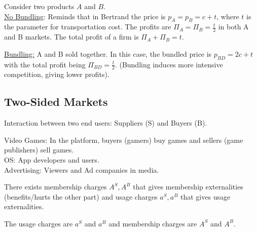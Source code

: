 \documentclass[11pt]{elegantbook}
\begin{document}
Consider two products $A$ and $B$.\\
\underline{No Bundling}: Reminds that in Bertrand the price is $p_A=p_B=c+t$, where $t$ is the parameter for transportation cost. The profits are $\Pi_A=\Pi_B=\frac{t}{2}$ in both A and B markets. The total profit of a firm is $\Pi_A+\Pi_B=t$.

\underline{Bundling:} A and B sold together. In this case, the bundled price is $p_{BD}=2c+t$ with the total profit being $\Pi_{BD}=\frac{t}{2}$. (Bundling induces more intensive competition, giving lower profits).

\subsection{Two-Sided Markets}
Interaction between two end users: Suppliers (S) and Buyers (B).
\begin{example}
    Video Games: In the platform, buyers (gamers) buy games and sellers (game publishers) sell games.\\
    OS: App developers and users.\\
    Advertising: Viewers and Ad companies in media.
\end{example}

There exists membership charges $A^S,A^B$ that gives membership externalities (benefits/hurts the other part) and usage charges $a^S,a^B$ that gives usage externalities.

The usage charges are $a^S$ and $a^B$ and membership charges are $A^S$ and $A^B$.









\end{document}
